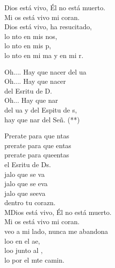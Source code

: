 \begin{cancion}%
	 Dios está vivo, Él no está muerto.\\
	Mi os está vivo mi coran. \\
	 Dios está vivo, ha resucitado,\\
	lo nto en mis nos,\\
	lo nto en mis p,\\
	lo nto en mi ma y en mi r.\jump\\
	\begin{chorus}%
		Oh.... Hay que nacer del ua\\
		Oh.... Hay que nacer\\
		del Esritu de D. \\
		Oh... Hay que nar\\
		del ua y del Espitu de s,\\
		hay que nar del Señ. (**) \jump\\
	\end{chorus}%
	Prerate para que ntas \\
	prerate para que entas \\
	prerate para queentas\\
	el Esritu de Ds. \\
	\jump
	jalo que se va \\
	jalo que se eva \\
	jalo que seeva\\
	dentro  tu corazn.\\
	\jump
	MDios está vivo, Él no está muerto.\\
	Mi os está vivo mi coran. \\
	 veo a mi lado, nunca me abandona\\
	loo en el ae,\\
	loo junto al ,\\
	lo  por el mte camin.\\
\end{cancion}%
